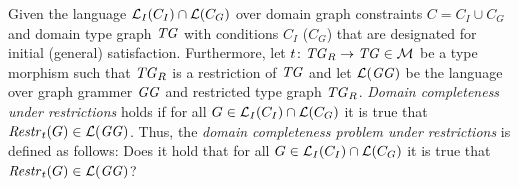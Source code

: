 \begin{definition}
\label{def:sec-dc-general-res:dc_prob}
Given the language $\mathcal{L}_I(C_I) \cap \mathcal{L}(C_G)$ over domain graph constraints $C=C_I \cup C_G$ and domain type graph $\mathit{TG}$ with conditions $C_I$ ($C_G$) that are designated for initial (general) satisfaction.
Furthermore, let $t\colon \mathit{TG}_R \to \mathit{TG} \in {\cal M}$ be a type morphism such that $\mathit{TG}_R$ is a restriction of $\mathit{TG}$ and let $\mathcal{L}(\mathit{GG})$ be the language over graph grammer $\mathit{GG}$ and restricted type graph $\mathit{TG}_R$.
\emph{Domain completeness under restrictions} holds if for all $G \in \mathcal{L}_I(C_I) \cap \mathcal{L}(C_G)$ it is true that $\mathit{Restr}_t(G) \in \mathcal{L}(\mathit{GG})$.
Thus, the \emph{domain completeness problem under restrictions} is defined as follows: Does it hold that for all $G \in \mathcal{L}_I(C_I) \cap \mathcal{L}(C_G)$ it is true that $\mathit{Restr}_t(G) \in \mathcal{L}(\mathit{GG})$?
\envEndMarker
\end{definition}

